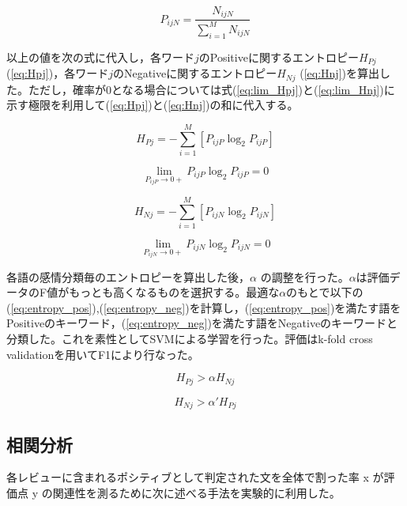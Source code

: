 \documentclass[review]{elsarticle}
\begin{document}
\begin{CJK}{UTF8}{min}
\begin{equation}\label{eq:PijN}
P_{ijN} = \frac{N_{ijN}}{\sum_{i=1}^M N_{ijN}}
\end{equation}

以上の値を次の式に代入し，各ワード\(j\)のPositiveに関するエントロピー\(H_{Pj}\) (\ref{eq:Hpj})，各ワード\(j\)のNegativeに関するエントロピー\(H_{Nj}\) (\ref{eq:Hnj})を算出した。ただし，確率が0となる場合については式(\ref{eq:lim_Hpj})と(\ref{eq:lim_Hnj})に示す極限を利用して(\ref{eq:Hpj})と(\ref{eq:Hnj})の和に代入する。

\begin{equation}\label{eq:Hpj}
H_{Pj} = - \sum_{i=1}^M [P_{ijP}\log_2 P_{ijP}]
\end{equation}

\begin{equation}\label{eq:lim_Hpj}
\lim_{P_{ijP}\to0+} P_{ijP}\log_2 P_{ijP} = 0
\end{equation}

\begin{equation}\label{eq:Hnj}
H_{Nj} = - \sum_{i=1}^M [P_{ijN}\log_2 P_{ijN}]
\end{equation}

\begin{equation}\label{eq:lim_Hnj}
\lim_{P_{ijN}\to0+} P_{ijN}\log_2 P_{ijN} = 0
\end{equation}

各語の感情分類毎のエントロピーを算出した後，\(\alpha\) の調整を行った。\(\alpha\)は評価データのF値がもっとも高くなるものを選択する。最適な\(\alpha\)のもとで以下の(\ref{eq:entropy_pos}),(\ref{eq:entropy_neg})を計算し，(\ref{eq:entropy_pos})を満たす語をPositiveのキーワード，(\ref{eq:entropy_neg})を満たす語をNegativeのキーワードと分類した。これを素性としてSVM\cite[][]{cortes1995}による学習を行った。評価はk-fold cross validationを用いてF1\cite[][]{powers2011}により行なった。

\begin{equation}\label{eq:entropy_pos}
H_{Pj} > \alpha H_{Nj}
\end{equation}

\begin{equation}\label{eq:entropy_neg}
H_{Nj} > \alpha' H_{Pj}
\end{equation}

\subsection{相関分析}\label{correlation}

各レビューに含まれるポシティブとして判定された文を全体で割った率 x が評価点 y の関連性を測るために次に述べる手法を実験的に利用した。


\end{CJK}
\end{document}
